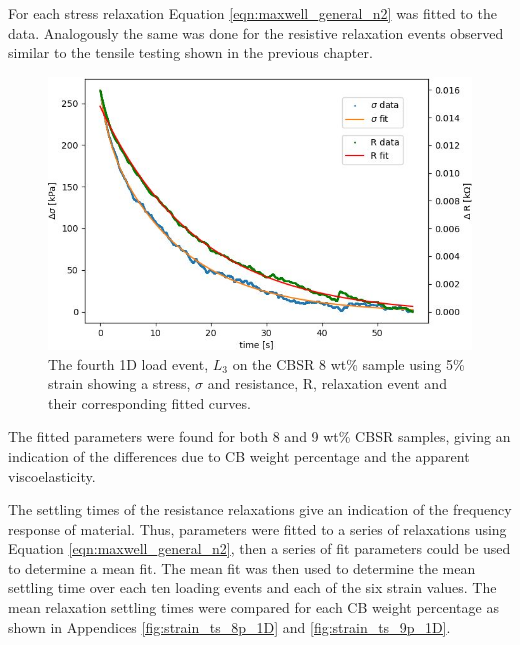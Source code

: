 For each stress relaxation Equation \ref{eqn:maxwell_general_n2} was fitted to the data. Analogously the same was done for the resistive relaxation events observed similar to the tensile testing shown in the previous chapter.
\begin{figure}[H]
    \centering
    \includegraphics[width=0.7\linewidth]{Figures/Push event 3 - CBSR 8 wt 5p strain - 1D compression test.jpg}
    \caption{The fourth 1D load event, $L_{3}$ on the CBSR 8 wt\% sample using 5\% strain showing a stress, $\sigma$ and resistance, R, relaxation event and their corresponding fitted curves.}
    \label{fig:push_event_relax_example}
\end{figure}
The fitted parameters were found for both 8 and 9 wt\% CBSR samples, giving an indication of the differences due to CB weight percentage and the apparent viscoelasticity.

The settling times of the resistance relaxations give an indication of the frequency response of material. Thus, parameters were fitted to a series of relaxations using Equation \ref{eqn:maxwell_general_n2}, then a series of fit parameters could be used to determine a mean fit. The mean fit was then used to determine the mean settling time over each ten loading events and each of the six strain values. The mean relaxation settling times were compared for each CB weight percentage as shown in Appendices \ref{fig:strain_ts_8p_1D} and \ref{fig:strain_ts_9p_1D}.




